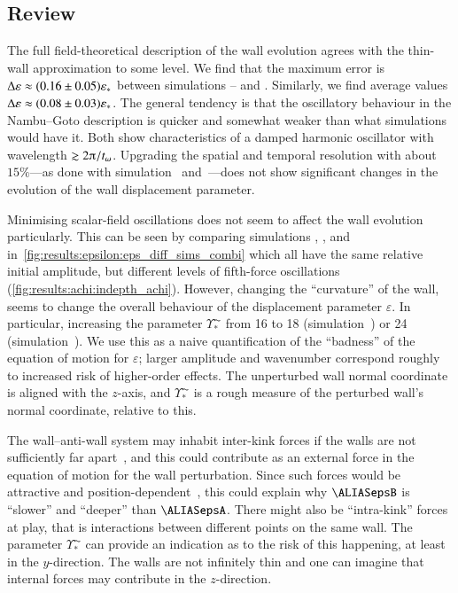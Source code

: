     \subsection{Review}%
        The full field-theoretical description of the wall evolution agrees with the thin-wall approximation to some level. We find that the maximum error is $ \Delta \varepsilon \approx (0.16 \pm 0.05)\varepsilon_\ast$ between simulations -- and . Similarly, we find average values $\Delta \varepsilon \approx (0.08 \pm 0.03)\varepsilon_\ast$. The general tendency is that the oscillatory behaviour in the Nambu--Goto description is quicker and somewhat weaker than what simulations would have it. Both show characteristics of a damped harmonic oscillator with wavelength $\gtrsim 2\ppi / t_\omega$. Upgrading the spatial and temporal resolution with about $15\%$---as done with simulation~ and~---does not show significant changes in the evolution of the wall displacement parameter.
        
        Minimising scalar-field oscillations does not seem to affect the wall evolution particularly. This can be seen by comparing simulations , ,  and  in~\cref{fig:results:epsilon:eps_diff_sims_combi} which all have the same relative initial amplitude, but different levels of fifth-force oscillations (\cref{fig:results:achi:indepth_achi}). However, changing the ``curvature'' of the wall, seems to change the overall behaviour of the displacement parameter $\varepsilon$. In particular, increasing the parameter $\Upsilon^{\AC}_\ast$ from 16 to 18 (simulation~) or 24 (simulation~). We use this as a naive quantification of the ``badness'' of the equation of motion for $\varepsilon$; larger amplitude and wavenumber correspond roughly to increased risk of higher-order effects. The unperturbed wall normal coordinate is aligned with the $z$-axis, and $\Upsilon^{\AC}_\ast$ is a rough measure of the perturbed wall's normal coordinate, relative to this. 

        The wall--anti-wall system may inhabit inter-kink forces if the walls are not sufficiently far apart~\citep{vachaspatiKinksDomainWalls2006}, and this could contribute as an external force in the equation of motion for the wall perturbation. Since such forces would be attractive and position-dependent~\citep{vachaspatiKinksDomainWalls2006}, this could explain why $\epsB$ is ``slower'' and ``deeper'' than $\epsA$. %
        There might also be ``intra-kink'' forces at play, that is interactions between different points on the same wall. The parameter $\Upsilon^{\AC}_\ast$ can provide an indication as to the risk of this happening, at least in the $y$-direction. The walls are not infinitely thin and one can imagine that internal forces may contribute in the $z$-direction.


